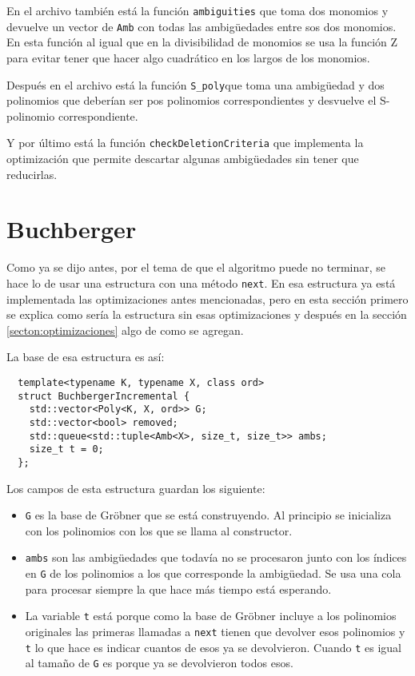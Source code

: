 \documentclass[12pt]{report}
\theoremstyle{customstyle}
\theoremstyle{factstyle}
\begin{document}
En el archivo también está la función \texttt{ambiguities} que toma dos monomios y devuelve un vector de \texttt{Amb} con todas las ambigüedades entre sos dos monomios. En esta función al igual que en la divisibilidad de monomios se usa la función Z para evitar tener que hacer algo cuadrático en los largos de los monomios.

Después en el archivo está la función \texttt{S\_poly}que toma una ambigüedad y dos polinomios que deberían ser pos polinomios correspondientes y desvuelve el S-polinomio correspondiente.

Y por último está la función \texttt{checkDeletionCriteria} que implementa la optimización que permite descartar algunas ambigüedades sin tener que reducirlas.


\section{Buchberger}

Como ya se dijo antes, por el tema de que el algoritmo puede no terminar, se hace lo de usar una estructura con una método \texttt{next}. En esa estructura ya está implementada las optimizaciones antes mencionadas, pero en esta sección primero se explica como sería la estructura sin esas optimizaciones y después en la sección \cref{secton:optimizaciones} algo de como se agregan.

La base de esa estructura es así:

\begin{verbatim}
  template<typename K, typename X, class ord>
  struct BuchbergerIncremental {
    std::vector<Poly<K, X, ord>> G;
    std::vector<bool> removed;
    std::queue<std::tuple<Amb<X>, size_t, size_t>> ambs;
    size_t t = 0;
  };
\end{verbatim}

Los campos de esta estructura guardan los siguiente:

\begin{itemize}
  \item \texttt{G} es la base de Gröbner que se está construyendo. Al principio se inicializa con los polinomios con los que se llama al constructor.
  \item \texttt{ambs} son las ambigüedades que todavía no se procesaron junto con los índices en \texttt{G} de los polinomios a los que corresponde la ambigüedad. Se usa una cola para procesar siempre la que hace más tiempo está esperando.
  \item La variable \texttt{t} está porque como la base de Gröbner incluye a los polinomios originales las primeras llamadas a \texttt{next} tienen que devolver esos polinomios y \texttt{t} lo que hace es indicar cuantos de esos ya se devolvieron. Cuando \texttt{t} es igual al tamaño de \texttt{G} es porque ya se devolvieron todos esos.
\end{itemize}
\end{document}

